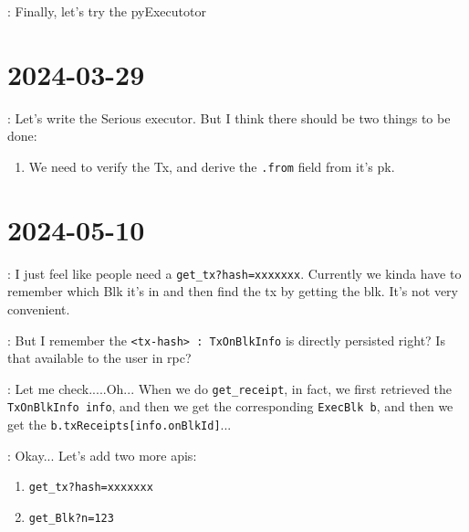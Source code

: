\documentclass[dvipsnames]{article}
\begin{document}
 : Finally, let's try the pyExecutotor

\section*{2024-03-29}
 : Let's write the Serious executor. But I think there should be
two things to be done:
\begin{enumerate}
\item We need to verify the Tx, and derive the \texttt{.from} field from it's
  pk. 
\end{enumerate}


\section*{2024-05-10}
 : I just feel like people need a \texttt{get\_tx?hash=xxxxxxx}.
Currently we kinda have to remember which Blk it's in and then find the tx by
getting the blk. It's not very convenient.

 : But I remember the \texttt{<tx-hash> : TxOnBlkInfo} is directly
persisted right? Is that available to the user in rpc?

 : Let me check.....Oh... When we do \texttt{get\_receipt}, in
fact, we first retrieved the \texttt{TxOnBlkInfo info}, and then we get the
corresponding \texttt{ExecBlk b}, and then we get the
\texttt{b.txReceipts[info.onBlkId]}...

 : Okay... Let's add two more apis:

\begin{enumerate}
\item \texttt{get\_tx?hash=xxxxxxx}
\item \texttt{get\_Blk?n=123}
\end{enumerate}
\end{document}
